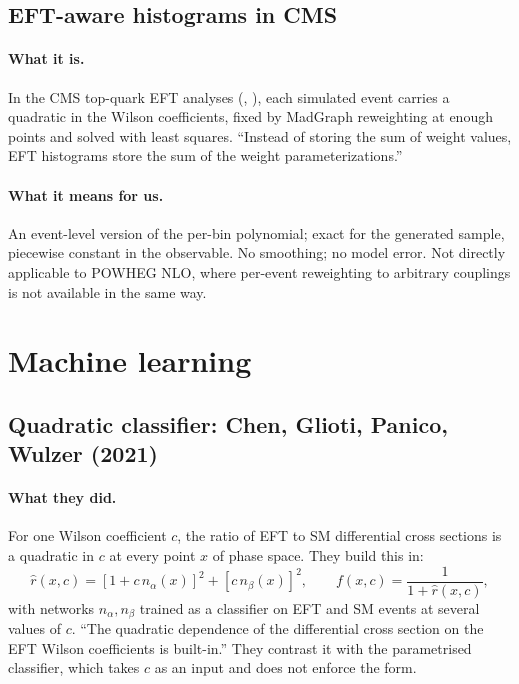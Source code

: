 \subsection{EFT-aware histograms in CMS \cite{Mohrman2023}}

\paragraph{What it is.} In the CMS top-quark EFT analyses (, ),
each simulated event carries a quadratic in the Wilson coefficients, fixed by MadGraph
reweighting at enough points and solved with least squares. ``Instead of storing the sum of
weight values, EFT histograms store the sum of the weight parameterizations.''

\paragraph{What it means for us.} An event-level version of the per-bin polynomial; exact
for the generated sample, piecewise constant in the observable. No smoothing; no model
error. Not directly applicable to POWHEG NLO, where per-event reweighting to arbitrary
couplings is not available in the same way.

\section{Machine learning}
\label{sec:ml}

\subsection{Quadratic classifier: Chen, Glioti, Panico, Wulzer (2021) \cite{Chen2021}}

\paragraph{What they did.} For one Wilson coefficient $c$, the ratio of EFT to SM
differential cross sections is a quadratic in $c$ at every point $x$ of phase space. They
build this in:
\begin{equation}
\hat r(x,c) = [1 + c\,n_\alpha(x)]^2 + [c\,n_\beta(x)]^2, \qquad
f(x,c) = \frac{1}{1+\hat r(x,c)},
\end{equation}
with networks $n_\alpha, n_\beta$ trained as a classifier on EFT and SM events at several
values of $c$. ``The quadratic dependence of the differential cross section on the EFT Wilson
coefficients is built-in.'' They contrast it with the parametrised classifier, which takes $c$
as an input and does not enforce the form.

